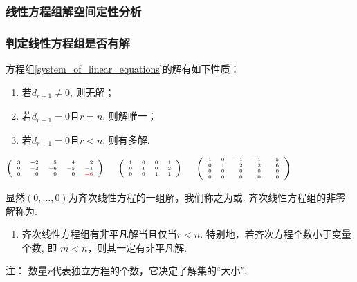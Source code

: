 \subsubsection{线性方程组解空间定性分析}
\begin{frame}\frametitle{判定线性方程组是否有解}
\begin{theorem}[解集大小判定] 方程组\eqref{system_of_linear_equations}的解有如下性质：\pp
\begin{enumerate}
\item 若$d_{r+1}\neq0$, 则无解； \pp
\item 若$d_{r+1}=0$且$r=n$, 则解唯一； \pp
\item 若$d_{r+1}=0$且$r<n$, 则有多解.
\end{enumerate}
\end{theorem}
\pp
\begin{example}
$\tiny \left(\begin{array}{rrrrr}3&-2&5&4&2\\0&-3&-6&-5&-1\\0&0&0&0&\red{-6}\\\end{array}\right)\qquad \left(\begin{array}{rrrr}1&0&0&1\\0&1&0&2\\0&0&1&1\\\end{array}\right) \qquad \left(\begin{array}{rrrrr}1&0&-1&-1&-5\\0&1&2&2&6\\0&0&0&0&0\\0&0&0&0&0\\\end{array}\right)$
\end{example}

\pp

\bigskip

显然$(0,\dots,0)$为齐次线性方程的一组解，我们称之为或. 齐次线性方程组的非零解称为.
\pp
\begin{corollary}
\begin{enumerate}
\item 齐次线性方程组有非平凡解当且仅当$r<n$. 特别地，若齐次方程个数小于变量个数, 即 $m<n$，则其一定有非平凡解.
\end{enumerate}
\end{corollary}
\pp
\bigskip

注： 数量$r$代表独立方程的个数，它决定了解集的“大小”.
\end{frame}





